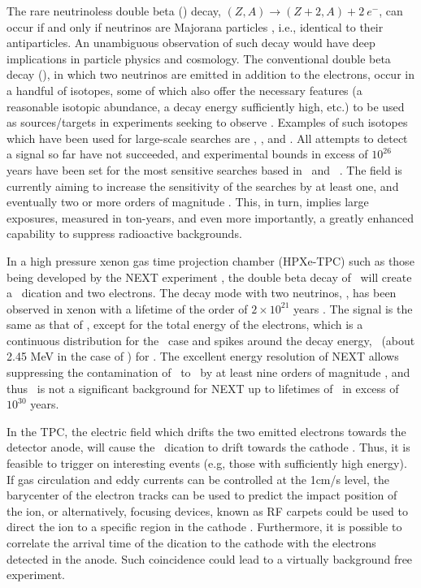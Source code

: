 \documentclass[aps,prl,reprint,longbibliography,superscriptaddress, english]{revtex4-1}
\begin{document}
The rare neutrinoless double beta  (\bbonu) decay, $(Z,A) \rightarrow (Z+2,A) + 2\ e^{-}$, can occur if and only if neutrinos are Majorana particles \cite{Majorana:1937}, i.e., identical to their antiparticles. An unambiguous observation of such decay would have deep implications in particle physics and cosmology\cite{Sakharov1967,Fukugita:1986hr, GellMann:1980vs, Yanagida:1979as, Mohapatra:1979ia}. 
The conventional double beta decay (\bbtnu), in which two neutrinos are emitted in addition to the electrons, occur in a handful of isotopes, some of which also offer the necessary features (a reasonable isotopic abundance, a decay energy sufficiently high, etc.) to be used as sources/targets in experiments seeking to observe \bbonu. Examples of such isotopes which have been used for large-scale searches are \GE, \TE, and \XE. All attempts to detect a signal so far have not succeeded, and experimental bounds in excess of $10^{26}$ years have been set for the most sensitive searches based in \XE\ and \GE\ \cite{Gando:2016ji, Agostini:2018tnm}.
The field is currently aiming to increase the sensitivity of the searches by at least one, and eventually two or more orders of magnitude \cite{Gomez-Cadenas:2019sfa}. This, in turn, implies large exposures, measured in ton-years, and even more importantly, a greatly enhanced capability to suppress radioactive backgrounds. 

In a high pressure xenon gas time projection chamber (HPXe-TPC) such as those being developed by the NEXT experiment \cite{Martin-Albo:2015rhw, NEXT:2020amj}, the double beta decay of \XE\ will create a \Bapp\ dication and two electrons.
The decay mode with two neutrinos, \bbtnu, has been observed in xenon with a lifetime of the order of $2 \times 10^{21}$ years \cite{Ackerman:2011gz}. The  signal is the same as that of \bbonu, except for the total energy of the electrons, which is a continuous distribution for the \bbtnu\ case and spikes around the decay energy, \Qbb\ (about 2.45 MeV in the case of \XE) for \cite{Martin-Albo:2015rhw}. The excellent energy resolution of NEXT allows suppressing the contamination of \bbtnu\ to \bbonu\ by at least nine orders of magnitude \cite{ALVAREZ2013101,Renner:2019pfe}, and thus \bbtnu\ is not a significant background for NEXT up to lifetimes of \bbonu\ in excess of $10^{30}$ years. 

In the TPC, the electric field which drifts the two emitted electrons towards the detector anode, will cause the \Bapp\ dication to drift towards the cathode \cite{Bainglass:2018odn}. Thus, it is feasible to trigger on interesting events (e.g, those with sufficiently high energy). If gas circulation and eddy currents can be controlled at the 1cm/s level, the barycenter of the electron tracks can be used to predict the impact position of the ion, or alternatively, focusing devices, known as RF carpets could be used to direct the ion to a specific region in the cathode \cite{NEXT:2021idl}. Furthermore, it is possible to correlate the arrival time of the dication to the cathode with the electrons detected in the anode. Such coincidence could lead to a virtually background free experiment. 
\end{document}
